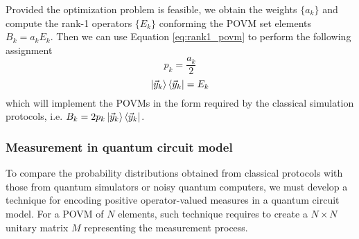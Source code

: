 Provided the optimization problem is feasible, we obtain the weights $\{a_k\}$ and compute the rank-1 operators $\{E_k\}$ conforming the POVM set elements $B_k=a_k E_k$. Then we can use Equation \ref{eq:rank1_povm} to perform the following assignment
\begin{equation}
    p_k = \frac{a_k}{2}
\end{equation}
\begin{equation}
    \ket{\vec{y}_k}\bra{\vec{y}_k} = E_k
\end{equation}
which will implement the POVMs in the form required by the classical simulation protocols, i.e. $B_{k} = 2p_{k}\ket{\vec{y}_{k}}\bra{\vec{y}_{k}}$.

\subsubsection{Measurement in quantum circuit model}
To compare the probability distributions obtained from classical protocols with those from quantum simulators or noisy quantum computers, we must develop a technique for encoding positive operator-valued measures in a quantum circuit model. For a POVM of $N$ elements, such technique requires to create a $N\times N$ unitary matrix $M$ representing the measurement process.

